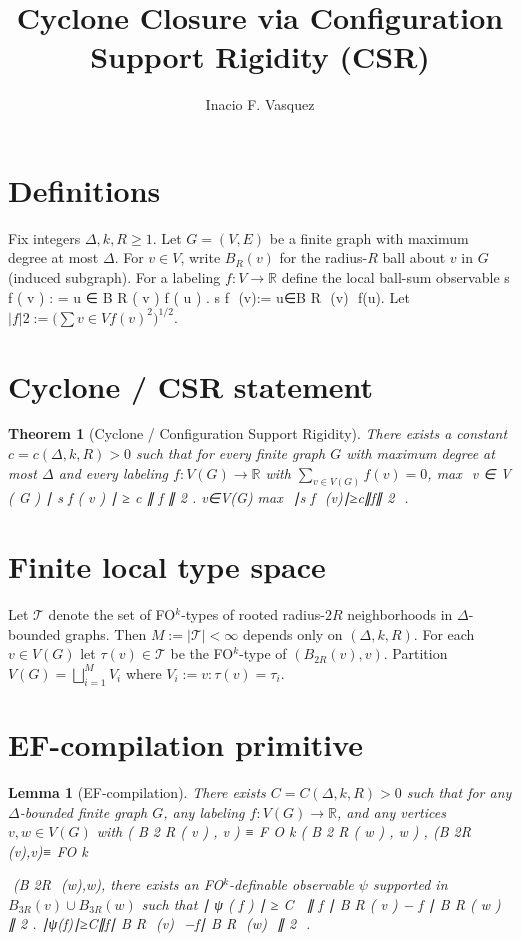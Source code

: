 \documentclass{article}
\title{Cyclone Closure via Configuration Support Rigidity (CSR)}
\author{Inacio F. Vasquez}
\date{}
\newtheorem{theorem}{Theorem}
\newtheorem{lemma}{Lemma}
\begin{document}
\maketitle
\section*{Definitions}
Fix integers $\Delta,k,R\ge 1$. Let $G=(V,E)$ be a finite graph with maximum degree at most $\Delta$.
For $v\in V$, write $B_R(v)$ for the radius-$R$ ball about $v$ in $G$ (induced subgraph).
For a labeling $f:V\to\mathbb{R}$ define the local ball-sum observable
s
f
(
v
)
:
=
\sum
u
∈
B
R
(
v
)
f
(
u
)
.
s 
f
​	
 (v):= 
u∈B 
R
​	
 (v)
\sum
​	
 f(u).
Let $|f|2:=\big(\sum{v\in V} f(v)^2\big)^{1/2}$.
\section*{Cyclone / CSR statement}
\begin{theorem}[Cyclone / Configuration Support Rigidity]
\label{thm:csr}
There exists a constant $c=c(\Delta,k,R)>0$ such that for every finite graph $G$ with maximum degree at most $\Delta$ and every labeling $f:V(G)\to\mathbb{R}$ with $\sum_{v\in V(G)} f(v)=0$,
max
⁡
v
∈
V
(
G
)
∣
s
f
(
v
)
∣
≥
c
∥
f
∥
2
.
v∈V(G)
max
​	
 ∣s 
f
​	
 (v)∣≥c∥f∥ 
2
​	
 .
\end{theorem}
\section*{Finite local type space}
Let $\mathcal{T}$ denote the set of FO$^k$-types of rooted radius-$2R$ neighborhoods in $\Delta$-bounded graphs.
Then $M:=|\mathcal{T}|<\infty$ depends only on $(\Delta,k,R)$.
For each $v\in V(G)$ let $\tau(v)\in\mathcal{T}$ be the FO$^k$-type of $(B_{2R}(v),v)$.
Partition $V(G)=\bigsqcup_{i=1}^M V_i$ where $V_i:={v:\tau(v)=\tau_i}$.
\section*{EF-compilation primitive}
\begin{lemma}[EF-compilation]
\label{lem:efcomp}
There exists $C=C(\Delta,k,R)>0$ such that for any $\Delta$-bounded finite graph $G$, any labeling $f:V(G)\to\mathbb{R}$, and any vertices $v,w\in V(G)$ with
(
B
2
R
(
v
)
,
v
)
≡
F
O
k
(
B
2
R
(
w
)
,
w
)
,
(B 
2R
​	
 (v),v)≡ 
FO 
k
 
​	
 (B 
2R
​	
 (w),w),
there exists an FO$^k$-definable observable $\psi$ supported in $B_{3R}(v)\cup B_{3R}(w)$ such that
∣
ψ
(
f
)
∣
≥
C
 
∥
f
∣
B
R
(
v
)
−
f
∣
B
R
(
w
)
∥
2
.
∣ψ(f)∣≥C∥f∣ 
B 
R
​	
 (v)
​	
 −f∣ 
B 
R
​	
 (w)
​	
 ∥ 
2
​	
 .
\end{lemma}
\end{document}
